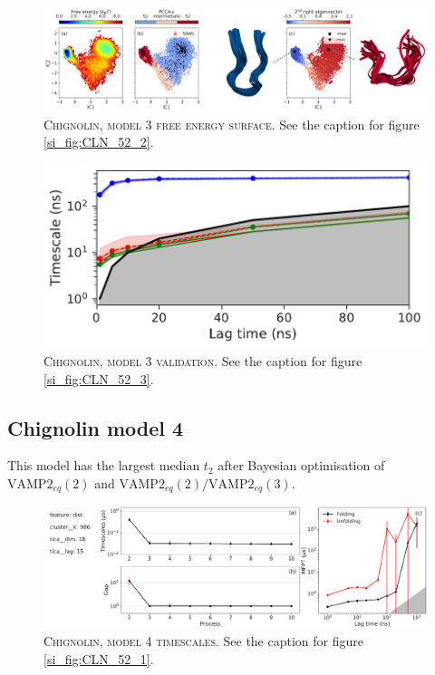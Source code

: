 \documentclass{article}
\begin{document}
\begin{figure}[h]
    \centering
    \includegraphics[width=\columnwidth]{SI_figures/CLN_218_SI-2.png}
    \caption{\textsc{Chignolin,  model 3 free energy surface}. See the caption for figure \ref{si_fig:CLN_52_2}.}
    \label{si_fig:CLN_218_2}
\end{figure}

\begin{figure}[h]
    \centering
    \includegraphics[height=0.15\textheight]{SI_figures/CLN_218_its.pdf}
    \caption{\textsc{Chignolin, model 3 validation}. See the caption for figure \ref{si_fig:CLN_52_3}.}
    \label{si_fig:CLN_218_3}
\end{figure}

\subsection{Chignolin model 4}

This model has the largest median $t_{2}$ after Bayesian optimisation of $\mathrm{VAMP2}_{eq}(2)$ and $\mathrm{VAMP2}_{eq}(2)/\mathrm{VAMP2}_{eq}(3)$.

\begin{figure}[h]
    \centering
    \includegraphics[width=\columnwidth]{SI_figures/CLN_93_SI1.pdf}
    \caption{\textsc{Chignolin,  model 4 timescales}.  See the caption for figure \ref{si_fig:CLN_52_1}. }
    \label{si_fig:CLN_93_1}
\end{figure}
\end{document}
